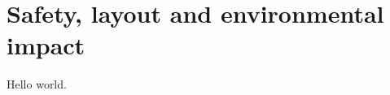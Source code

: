 \chapter{Safety, layout and environmental impact}
\label{sec:safety-layout-environment}

Hello world.



